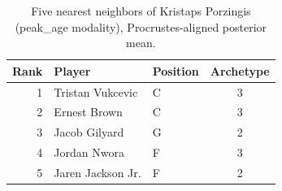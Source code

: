 \begin{table}[htbp]
  \centering\small
  \begin{tabular}{rllc}
    \toprule
    Rank & Player & Position & Archetype \\
    \midrule
    1 & Tristan Vukcevic & C & 3 \\
    2 & Ernest Brown & C & 3 \\
    3 & Jacob Gilyard & G & 2 \\
    4 & Jordan Nwora & F & 3 \\
    5 & Jaren Jackson Jr. & F & 2 \\
    \bottomrule
  \end{tabular}
  \caption{Five nearest neighbors of Kristaps Porzingis (peak_age modality), Procrustes-aligned posterior mean.}
  \label{tab:Kristaps_Porzingis_neighbors_peak_age}
\end{table}

